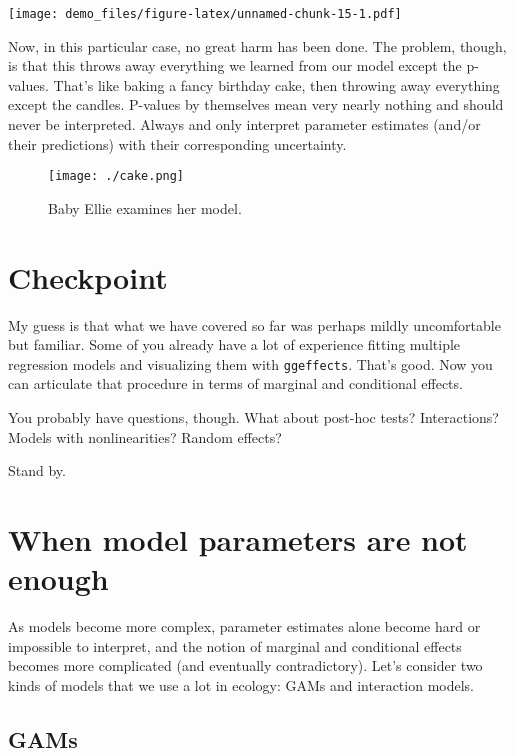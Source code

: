 \documentclass[
]{article}
\begin{document}
\texttt{[image: demo\_files/figure-latex/unnamed-chunk-15-1.pdf]}

Now, in this particular case, no great harm has been done. The problem,
though, is that this throws away everything we learned from our model
except the p-values. That's like baking a fancy birthday cake, then
throwing away everything except the candles. P-values by themselves mean
very nearly nothing and should never be interpreted. Always and only
interpret parameter estimates (and/or their predictions) with their
corresponding uncertainty.

\begin{figure}
\centering
\texttt{[image: ./cake.png]}
\caption{Baby Ellie examines her model.}
\end{figure}

\hypertarget{checkpoint}{%
\section{Checkpoint}\label{checkpoint}}

My guess is that what we have covered so far was perhaps mildly
uncomfortable but familiar. Some of you already have a lot of experience
fitting multiple regression models and visualizing them with
\texttt{ggeffects}. That's good. Now you can articulate that procedure
in terms of marginal and conditional effects.

You probably have questions, though. What about post-hoc tests?
Interactions? Models with nonlinearities? Random effects?

Stand by.

\hypertarget{when-model-parameters-are-not-enough}{%
\section{When model parameters are not
enough}\label{when-model-parameters-are-not-enough}}

As models become more complex, parameter estimates alone become hard or
impossible to interpret, and the notion of marginal and conditional
effects becomes more complicated (and eventually contradictory). Let's
consider two kinds of models that we use a lot in ecology: GAMs and
interaction models.

\hypertarget{gams}{%
\subsection{GAMs}\label{gams}}
\end{document}
